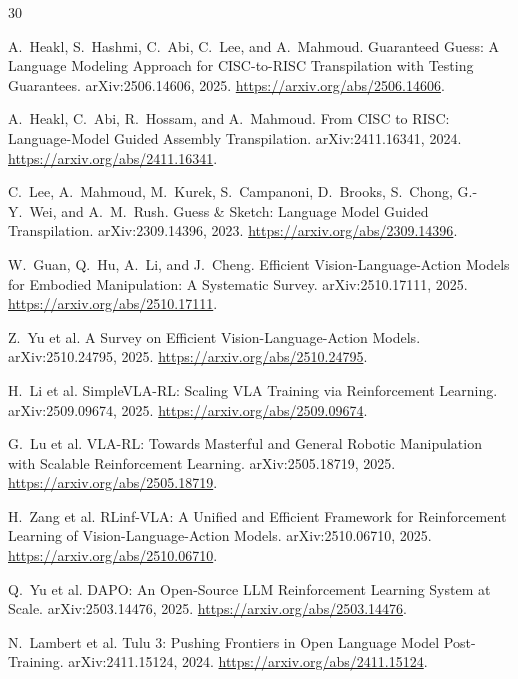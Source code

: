 \documentclass{article}
\begin{document}
\small
\begin{thebibliography}{30}

A.~Heakl, S.~Hashmi, C.~Abi, C.~Lee, and A.~Mahmoud.
\newblock Guaranteed Guess: A Language Modeling Approach for CISC-to-RISC Transpilation with Testing Guarantees.
\newblock arXiv:2506.14606, 2025.
\newblock \url{https://arxiv.org/abs/2506.14606}.

A.~Heakl, C.~Abi, R.~Hossam, and A.~Mahmoud.
\newblock From CISC to RISC: Language-Model Guided Assembly Transpilation.
\newblock arXiv:2411.16341, 2024.
\newblock \url{https://arxiv.org/abs/2411.16341}.

C.~Lee, A.~Mahmoud, M.~Kurek, S.~Campanoni, D.~Brooks, S.~Chong, G.-Y.~Wei, and A.~M.~Rush.
\newblock Guess \& Sketch: Language Model Guided Transpilation.
\newblock arXiv:2309.14396, 2023.
\newblock \url{https://arxiv.org/abs/2309.14396}.

W.~Guan, Q.~Hu, A.~Li, and J.~Cheng.
\newblock Efficient Vision-Language-Action Models for Embodied Manipulation: A Systematic Survey.
\newblock arXiv:2510.17111, 2025.
\newblock \url{https://arxiv.org/abs/2510.17111}.

Z.~Yu et al.
\newblock A Survey on Efficient Vision-Language-Action Models.
\newblock arXiv:2510.24795, 2025.
\newblock \url{https://arxiv.org/abs/2510.24795}.

H.~Li et al.
\newblock SimpleVLA-RL: Scaling VLA Training via Reinforcement Learning.
\newblock arXiv:2509.09674, 2025.
\newblock \url{https://arxiv.org/abs/2509.09674}.

G.~Lu et al.
\newblock VLA-RL: Towards Masterful and General Robotic Manipulation with Scalable Reinforcement Learning.
\newblock arXiv:2505.18719, 2025.
\newblock \url{https://arxiv.org/abs/2505.18719}.

H.~Zang et al.
\newblock RLinf-VLA: A Unified and Efficient Framework for Reinforcement Learning of Vision-Language-Action Models.
\newblock arXiv:2510.06710, 2025.
\newblock \url{https://arxiv.org/abs/2510.06710}.

Q.~Yu et al.
\newblock DAPO: An Open-Source LLM Reinforcement Learning System at Scale.
\newblock arXiv:2503.14476, 2025.
\newblock \url{https://arxiv.org/abs/2503.14476}.

N.~Lambert et al.
\newblock Tulu 3: Pushing Frontiers in Open Language Model Post-Training.
\newblock arXiv:2411.15124, 2024.
\newblock \url{https://arxiv.org/abs/2411.15124}.


\end{thebibliography}
\end{document}
